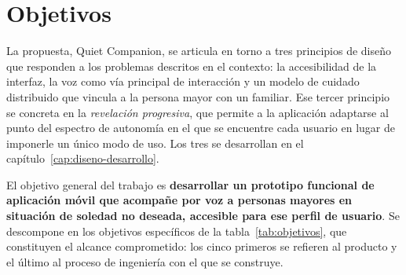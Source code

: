 \section{Objetivos}

La propuesta, Quiet Companion, se articula en torno a tres principios de diseño que responden a los problemas
descritos en el contexto: la accesibilidad de la interfaz, la voz como vía principal de interacción y un
modelo de cuidado distribuido que vincula a la persona mayor con un familiar. Ese tercer principio se
concreta en la \textit{revelación progresiva}, que permite a la aplicación adaptarse al punto del espectro de
autonomía en el que se encuentre cada usuario en lugar de imponerle un único modo de uso. Los tres se
desarrollan en el capítulo~\ref{cap:diseno-desarrollo}.

El objetivo general del trabajo es \textbf{desarrollar un prototipo funcional de aplicación móvil que
acompañe por voz a personas mayores en situación de soledad no deseada, accesible para ese perfil de
usuario}. Se descompone en los objetivos específicos de la tabla~\ref{tab:objetivos}, que constituyen el
alcance comprometido: los cinco primeros se refieren al producto y el último al proceso de ingeniería con el
que se construye.

